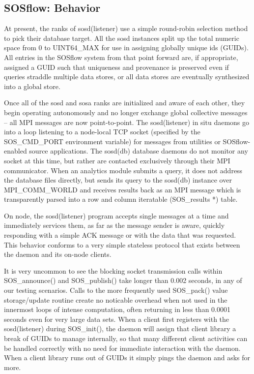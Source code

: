 \subsection{SOSflow: Behavior}
%
At present, the ranks of sosd(listener) use a simple round-robin
selection method to pick their database target.
%
All the sosd instances split up the total numeric space from 0 to
UINT64\_MAX for use in assigning globally unique ids (GUIDs).
%
All entries in the SOSflow system from that point forward are, if
appropriate, assigned a GUID such that uniqueness and provenance is
preserved even if queries straddle multiple data stores, or all data
stores are eventually synthesized into a global store.



Once all of the sosd and sosa ranks are initialized and aware of each
other, they begin operating autonomously and no longer exchange global
collective messages -- all MPI messages are now point-to-point.
%
The sosd(listener) in situ daemons go into a loop listening to a
node-local TCP socket (specified by the SOS\_CMD\_PORT environment
variable) for messages from utilities or SOSflow-enabled source
applications.
%
The sosd(db) database daemons do not monitor any socket at this time,
but rather are contacted exclusively through their MPI communicator.
%
When an analytics module submits a query, it does not address the
database files directly, but sends its query to the sosd(db) instance
over MPI\_COMM\_WORLD and receives results back as an MPI message
which is transparently parsed into a row and column iteratable
(SOS\_results *) table.

On node, the sosd(listener) program accepts single messages at a time
and immediately services them, as far as the message sender is aware,
quickly responding with a simple ACK message or with the data that was
requested.  This behavior conforms to a very simple stateless protocol
that exists between the daemon and its on-node clients.


%


%
It is very uncommon to see the blocking socket transmission calls
within SOS\_announce() and SOS\_publish() take longer than 0.002
seconds, in any of our testing scenarios. Calls to the more frequently
used SOS\_pack() value storage/update routine create no noticable
overhead when not used in the innermost loops of intense computation,
often returning in less than 0.0001 seconds even for very large data
sets.
%
When a client first registers with the sosd(listener) during
SOS\_init(), the daemon will assign that client library a break of
GUIDs to manage internally, so that many different client activities
can be handled correctly with no need for immediate interaction with
the daemon.
%
When a client library runs out of GUIDs it simply pings the daemon and
asks for more.

